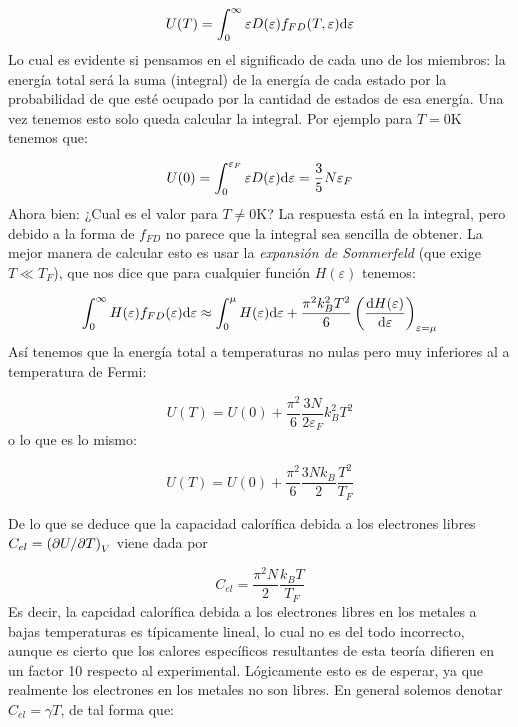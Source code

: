 \begin{equation}
	U(T) = \int_0^{\infty} \varepsilon D(\varepsilon) f_{FD} (T,\varepsilon) \mathrm{d} \varepsilon  
\end{equation}
Lo cual es evidente si pensamos en el significado de cada uno de los miembros: la energía total será la suma (integral)  de la energía de cada estado por la probabilidad de que esté ocupado por la cantidad de estados de esa energía. Una vez tenemos esto solo queda calcular la integral. Por ejemplo para $T=0$K tenemos que:

\begin{equation}
	U(0) = \int_0^{\varepsilon_F} \varepsilon D (\varepsilon) \mathrm{d} \varepsilon = \frac{3}{5} N \varepsilon_F
\end{equation} 
Ahora bien: ¿Cual es el valor para $T\neq 0$K? La respuesta está en la integral, pero debido a la forma de $f_{FD}$ no parece que la integral sea sencilla de obtener. La mejor manera de calcular esto es usar la \textit{expansión de Sommerfeld} (que exige $T\ll T_F$), que nos dice que para cualquier función $H(\varepsilon)$ tenemos:

\begin{equation}
	\int_0^{\infty} H(\varepsilon) f_{FD} (\varepsilon) \mathrm{d} \varepsilon \approx 
	\int_0^{\mu} H(\varepsilon) \mathrm{d} \varepsilon + \frac{\pi^2k_B^2T^2}{6} \left( \frac{\mathrm{d} H(\varepsilon)}{\mathrm{d} \varepsilon} \right)_{\varepsilon=\mu}
\end{equation}
Así tenemos que la energía total a temperaturas no nulas pero muy inferiores al a temperatura de Fermi:

\begin{equation}
	U(T) = U(0) + \frac{\pi^2}{6} \frac{3 N}{2 \varepsilon_F} k_B^2 T^2
\end{equation}
o lo que es lo mismo:

\begin{mybox}
\begin{equation}
	U(T) = U(0) + \frac{\pi^2}{6} \frac{3 N k_B }{2 } \frac{T^2}{T_F}
\end{equation}
\end{mybox}
De lo que se deduce que la capacidad calorífica debida a los electrones libres  $C_{el} = \left( \partial U/\partial T \right)_V$ viene dada por

\begin{equation}
	C_{el} = \frac{\pi^2 N}{2} \frac{k_B T}{T_F}
\end{equation}
Es decir, la capcidad calorífica debida a los electrones libres en los metales a bajas temperaturas es típicamente lineal, lo cual no es del todo incorrecto, aunque es cierto que los calores específicos resultantes de esta teoría difieren en un factor 10 respecto al experimental. Lógicamente esto es de esperar, ya que realmente los electrones en los metales no son libres. En general solemos denotar $C_{el} = \gamma T$, de tal forma que:

